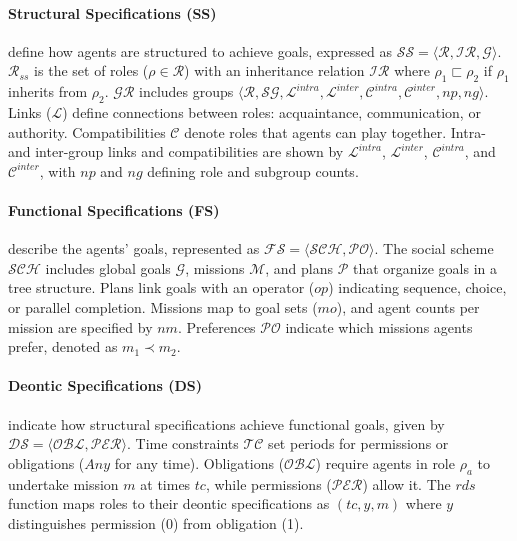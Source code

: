\documentclass[sigconf,anonymous]{aamas}
\begin{document}
\noindent \paragraph{\textbf{Structural Specifications (SS)}} define how agents are structured to achieve goals, expressed as $\mathcal{SS} = \langle \mathcal{R}, \mathcal{IR}, \mathcal{G} \rangle$. $\mathcal{R}_{ss}$ is the set of roles ($\rho \in \mathcal{R}$) with an inheritance relation $\mathcal{IR}$ where $\rho_1 \sqsubset \rho_2$ if $\rho_1$ inherits from $\rho_2$. $\mathcal{GR}$ includes groups $\langle \mathcal{R}, \mathcal{SG}, \mathcal{L}^{intra}, \mathcal{L}^{inter}, \allowbreak \mathcal{C}^{intra}, \mathcal{C}^{inter}, np, ng \rangle$. Links ($\mathcal{L}$) define connections between roles: acquaintance, communication, or authority. Compatibilities $\mathcal{C}$ denote roles that agents can play together. Intra- and inter-group links and compatibilities are shown by $\mathcal{L}^{intra}$, $\mathcal{L}^{inter}$, $\mathcal{C}^{intra}$, and $\mathcal{C}^{inter}$, with $np$ and $ng$ defining role and subgroup counts.

\noindent \paragraph{\textbf{Functional Specifications (FS)}} describe the agents' goals, represented as $\mathcal{FS} = \langle \mathcal{SCH}, \mathcal{PO} \rangle$. The social scheme $\mathcal{SCH}$ includes global goals $\mathcal{G}$, missions $\mathcal{M}$, and plans $\mathcal{P}$ that organize goals in a tree structure. Plans link goals with an operator ($op$) indicating sequence, choice, or parallel completion. Missions map to goal sets ($mo$), and agent counts per mission are specified by $nm$. Preferences $\mathcal{PO}$ indicate which missions agents prefer, denoted as $m_1 \prec m_2$.

\noindent \paragraph{\textbf{Deontic Specifications (DS)}} indicate how structural specifications achieve functional goals, given by $\mathcal{DS} = \langle \mathcal{OBL}, \mathcal{PER} \rangle$. Time constraints $\mathcal{TC}$ set periods for permissions or obligations ($Any$ for any time). Obligations ($\mathcal{OBL}$) require agents in role $\rho_a$ to undertake mission $m$ at times $tc$, while permissions ($\mathcal{PER}$) allow it. The $rds$ function maps roles to their deontic specifications as $(tc, y, m)$ where $y$ distinguishes permission (0) from obligation (1).
\end{document}

